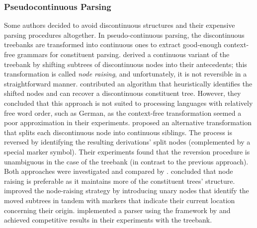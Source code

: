 \documentclass[../document.tex]{subfiles}
\begin{document}
    \subsubsection*{Pseudocontinuous Parsing}
    Some authors decided to avoid discontinuous structures and their expensive parsing procedures altogether.
    In pseudo-continuous parsing, the discontinuous treebanks are transformed into continuous ones to extract good-enough context-free grammars for constituent parsing.
     derived a continuous variant of the \negra{} treebank by shifting subtrees of discontinuous nodes into their antecedents; this transformation is called \emph{node raising}, and unfortunately, it is not reversible in a straightforward manner.
     contributed an algorithm that heuristically identifies the shifted nodes and can recover a discontinuous constituent tree.
    However, they concluded that this approach is not suited to processing languages with relatively free word order, such as German, as the context-free transformation seemed a poor approximation in their experiments.
     proposed an alternative transformation that splits each discontinuous node into continuous siblings.
    The process is reversed by identifying the resulting derivations' split nodes (complemented by a special marker symbol).
    Their experiments found that the reversion procedure is unambiguous in the case of the \tiger{} treebank (in contrast to the previous approach).
    Both approaches were investigated and compared by \citet{hsu2010comparing}.
     concluded that node raising is preferable as it maintains more of the constituent trees' structure.
     improved the node-raising strategy by introducing unary nodes that identify the moved subtrees in tandem with markers that indicate their current location concerning their origin.
    \citeauthor{Ver16} implemented a parser using the  framework by \citet{Petrov06} and achieved competitive results in their experiments with the \tiger{} treebank.

\end{document}
